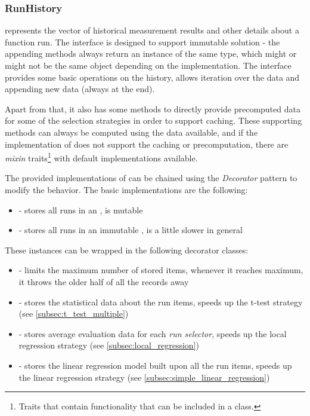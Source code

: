 \subsubsection{RunHistory}

 represents the vector of historical measurement results and other details about a function run. The interface is designed to support immutable solution - the appending methods always return an instance of the same type, which might or might not be the same object depending on the implementation. The interface provides some basic operations on the history, allows iteration over the data and appending new data (always at the end). 

Apart from that, it also has some methods to directly provide precomputed data for some of the selection strategies in order to support caching. These supporting methods can always be computed using the data available, and if the implementation of  does not support the caching or precomputation, there are \textit{mixin} traits\footnote{Traits that contain functionality that can be included in a class.} with default implementations available.

The provided implementations of  can be chained using the \textit{Decorator} pattern to modify the behavior. The basic implementations are the following:
\begin{itemize}
	\item {} - stores all runs in an , is mutable
	\item {} - stores all runs in an immutable , is a little slower in general
\end{itemize}

These instances can be wrapped in the following decorator classes:
\begin{itemize}
	\item {} - limits the maximum number of stored items, whenever it reaches maximum, it throws the older half of all the records away
	\item {} - stores the statistical data about the run items, speeds up the t-test strategy (see \ref{subsec:t_test_multiple})
	\item {} - stores average evaluation data for each \textit{run selector}, speeds up the local regression strategy (see \ref{subsec:local_regression})
	\item {} - stores the linear regression model built upon all the run items, speeds up the linear regression strategy (see \ref{subsec:simple_linear_regression})
\end{itemize}

